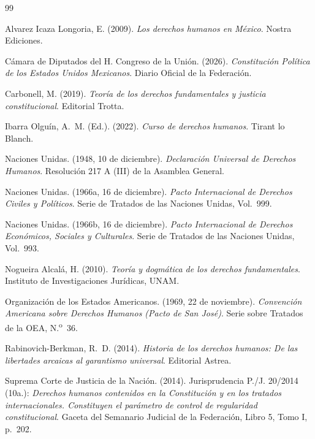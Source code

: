\documentclass[12pt,spanish,letterpaper,oneside]{article}
\begin{document}
\clearpage
\begin{thebibliography}{99}

Alvarez Icaza Longoria, E. (2009). \emph{Los derechos humanos en M\'exico}. Nostra Ediciones.

C\'amara de Diputados del H. Congreso de la Uni\'on. (2026). \emph{Constituci\'on Pol\'itica de los Estados Unidos Mexicanos}. Diario Oficial de la Federaci\'on.

Carbonell, M. (2019). \emph{Teor\'ia de los derechos fundamentales y justicia constitucional}. Editorial Trotta.

Ibarra Olgu\'in, A.~M. (Ed.). (2022). \emph{Curso de derechos humanos}. Tirant lo Blanch.

Naciones Unidas. (1948, 10 de diciembre). \emph{Declaraci\'on Universal de Derechos Humanos}. Resoluci\'on 217 A (III) de la Asamblea General.

Naciones Unidas. (1966a, 16 de diciembre). \emph{Pacto Internacional de Derechos Civiles y Pol\'iticos}. Serie de Tratados de las Naciones Unidas, Vol.~999.

Naciones Unidas. (1966b, 16 de diciembre). \emph{Pacto Internacional de Derechos Econ\'omicos, Sociales y Culturales}. Serie de Tratados de las Naciones Unidas, Vol.~993.

Nogueira Alcal\'a, H. (2010). \emph{Teor\'ia y dogm\'atica de los derechos fundamentales}. Instituto de Investigaciones Jur\'idicas, UNAM.

Organizaci\'on de los Estados Americanos. (1969, 22 de noviembre). \emph{Convenci\'on Americana sobre Derechos Humanos (Pacto de San Jos\'e)}. Serie sobre Tratados de la OEA, N.\textsuperscript{o}~36.

Rabinovich-Berkman, R.~D. (2014). \emph{Historia de los derechos humanos: De las libertades arcaicas al garantismo universal}. Editorial Astrea.

Suprema Corte de Justicia de la Naci\'on. (2014). Jurisprudencia P./J. 20/2014 (10a.): \emph{Derechos humanos contenidos en la Constituci\'on y en los tratados internacionales. Constituyen el par\'ametro de control de regularidad constitucional}. Gaceta del Semanario Judicial de la Federaci\'on, Libro 5, Tomo I, p.~202.


\end{thebibliography}
\end{document}
